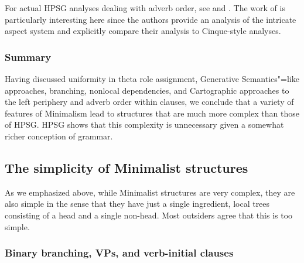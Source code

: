 \documentclass[output=paper
 	        ,biblatex
                ,babelshorthands
                ,newtxmath
                ,draftmode
                ,colorlinks, citecolor=brown
]{langscibook}
\begin{document}
For actual HPSG analyses dealing with adverb order, see  and .
The work of \citet{KM2005a} is particularly interesting here since the authors provide an analysis of the
intricate  aspect system and explicitly compare their analysis to Cinque-style analyses.


\subsubsection{Summary}

Having discussed uniformity in theta role assignment, Generative Semantics"=like approaches,
branching, nonlocal dependencies, and Cartographic approaches to the left periphery and adverb 
order within clauses,  we conclude that a variety of features of Minimalism lead to structures that
are much more complex than those of HPSG. HPSG shows that this complexity is unnecessary given a
somewhat richer conception of grammar. 

\subsection{The simplicity of Minimalist structures}
\label{subsec:min-simplicity}

As we emphasized above, while Minimalist structures are very complex, they are also simple in the
sense that they have just a single ingredient, local trees consisting of a head and a single
non-head. Most outsiders agree that this is too simple.

\subsubsection{Binary branching, VPs, and verb-initial clauses}
\end{document}
